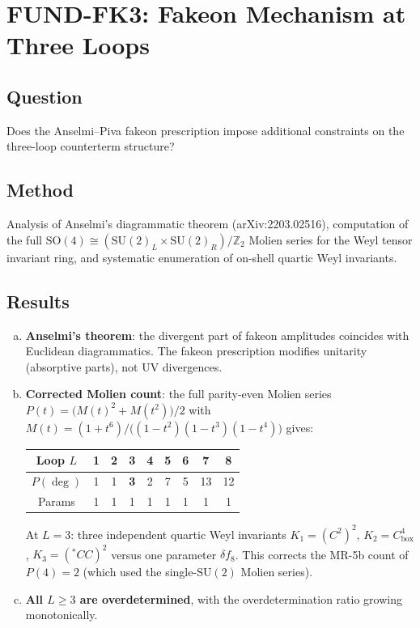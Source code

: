 \documentclass[12pt,a4paper]{article}
\begin{document}
\section{FUND-FK3: Fakeon Mechanism at Three Loops}
\label{sec:fk3}

\subsection{Question}
Does the Anselmi--Piva fakeon prescription impose additional constraints on the
three-loop counterterm structure?

\subsection{Method}
Analysis of Anselmi's diagrammatic theorem (arXiv:2203.02516), computation of the
full $\mathrm{SO}(4) \cong (\mathrm{SU}(2)_L \times \mathrm{SU}(2)_R)/\mathbb{Z}_2$
Molien series for the Weyl tensor invariant ring, and systematic enumeration of
on-shell quartic Weyl invariants.

\subsection{Results}
\begin{enumerate}[(a)]
  \item \textbf{Anselmi's theorem}: the divergent part of fakeon amplitudes
    coincides with Euclidean diagrammatics.  The fakeon prescription modifies
    unitarity (absorptive parts), not UV divergences.
  \item \textbf{Corrected Molien count}: the full parity-even Molien series
    $P(t) = \bigl(M(t)^2 + M(t^2)\bigr)/2$ with
    $M(t) = (1+t^6)/\bigl((1-t^2)(1-t^3)(1-t^4)\bigr)$ gives:
    \begin{center}
    \begin{tabular}{c|cccccccc}
    \toprule
    Loop $L$ & 1 & 2 & 3 & 4 & 5 & 6 & 7 & 8 \\
    \midrule
    $P(\deg)$ & 1 & 1 & \textbf{3} & 2 & 7 & 5 & 13 & 12 \\
    Params & 1 & 1 & 1 & 1 & 1 & 1 & 1 & 1 \\
    \bottomrule
    \end{tabular}
    \end{center}
    At $L=3$: three independent quartic Weyl invariants
    $K_1 = (C^2)^2$, $K_2 = C^4_{\mathrm{box}}$, $K_3 = ({}^*\!CC)^2$
    versus one parameter $\delta f_8$.  This corrects the MR-5b count of $P(4)=2$
    (which used the single-$\mathrm{SU}(2)$ Molien series).
  \item \textbf{All $L \geq 3$ are overdetermined}, with the overdetermination
    ratio growing monotonically.
\end{enumerate}
\end{document}
